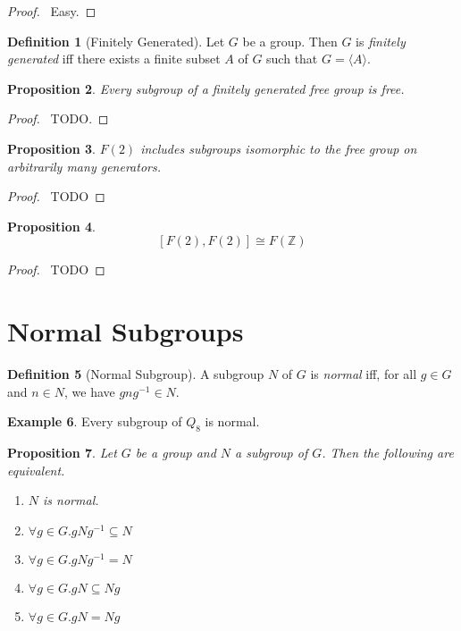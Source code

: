 \documentclass{book}
\let\qed\relax
\newtheorem{prop}{Proposition}[chapter]
\theoremstyle{definition}
\newtheorem{df}[prop]{Definition}
\newtheorem{ex}[prop]{Example}
\newcommand{\inv}[1]{\ensuremath{{#1}^{-1}}}
\begin{document}
\begin{proof}
\pf\ Easy. \qed
\end{proof}

\begin{df}[Finitely Generated]
Let $G$ be a group. Then $G$ is \emph{finitely generated} iff there exists a finite subset $A$ of $G$ such that $G = \langle A \rangle$.
\end{df}

\begin{prop}
Every subgroup of a finitely generated free group is free.
\end{prop}

\begin{proof}
\pf\ TODO.
\end{proof}

\begin{prop}
$F(2)$ includes subgroups isomorphic to the free group on arbitrarily many generators.
\end{prop}

\begin{proof}
\pf\ TODO
\end{proof}

\begin{prop}
\[ [F(2),F(2)] \cong F(\mathbb{Z}) \]
\end{prop}

\begin{proof}
\pf\ TODO
\end{proof}

\section{Normal Subgroups}

\begin{df}[Normal Subgroup]
A subgroup $N$ of $G$ is \emph{normal} iff, for all $g \in G$ and $n \in N$, we have $gn\inv{g} \in N$.
\end{df}

\begin{ex}
Every subgroup of $Q_8$ is normal.
\end{ex}

\begin{prop}
Let $G$ be a group and $N$ a subgroup of $G$. Then the following are equivalent.
\begin{enumerate}
\item $N$ is normal.
\item $\forall g \in G. g N \inv{g} \subseteq N$
\item $\forall g \in G. g N \inv{g} = N$
\item $\forall g \in G. g N \subseteq N g$
\item $\forall g \in G. gN = Ng$
\end{enumerate}
\end{prop}
\end{document}
